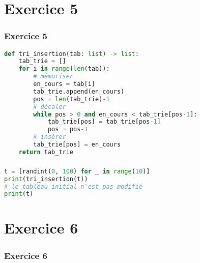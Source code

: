 \documentclass[svgnames,11pt]{beamer}
\begin{document}
\section{Exercice 5}
\begin{frame}[fragile]
    \frametitle{Exercice 5}
\begin{center}
\begin{lstlisting}[language=Python , basicstyle=\ttfamily\small, xleftmargin=0.2em, xrightmargin=-2em]
def tri_insertion(tab: list) -> list:
    tab_trie = []
    for i in range(len(tab)):
        # mémoriser
        en_cours = tab[i]
        tab_trie.append(en_cours)
        pos = len(tab_trie)-1
        # décaler
        while pos > 0 and en_cours < tab_trie[pos-1]:
            tab_trie[pos] = tab_trie[pos-1]
            pos = pos-1
        # insérer
        tab_trie[pos] = en_cours
    return tab_trie
\end{lstlisting}
\end{center}
    

\end{frame}
\begin{frame}[fragile]
    \frametitle{}

\begin{center}
\begin{lstlisting}[language=Python , basicstyle=\ttfamily\small, xleftmargin=2em, xrightmargin=2em]
t = [randint(0, 100) for _ in range(10)]
print(tri_insertion(t))
# le tableau initial n'est pas modifié
print(t)
\end{lstlisting}
\end{center}

\end{frame}
\section{Exercice 6}
\begin{frame}[fragile]
    \frametitle{Exercice 6}

    

\end{frame}
\end{document}
